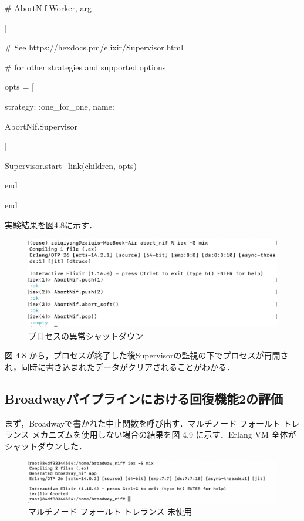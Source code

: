\documentclass[a4paper]{jreport}	%
\begin{document}
      \# {AbortNif.Worker, arg}
      
    ]

    \# See https://hexdocs.pm/elixir/Supervisor.html
    
    \# for other strategies and supported options
    
    opts = [
    
    strategy: :one\_for\_one, name: 
    
    AbortNif.Supervisor
    
    ]
    
    Supervisor.start\_link(children, opts)
    
  end
  
end

実験結果を図4.8に示す．

\begin{figure}[H]
\vspace{3cm}
\begin{center}
\hspace{-8cm}
\includegraphics[scale=0.5]{ja/f11.png}
\end{center}
\caption{プロセスの異常シャットダウン}
\end{figure}

図 4.8 から，プロセスが終了した後Supervisorの監視の下でプロセスが再開され，同時に書き込まれたデータがクリアされることがわかる．

\subsection{Broadwayパイプラインにおける回復機能2の評価}
まず，Broadwayで書かれた中止関数を呼び出す．マルチノード フォールト トレランス メカニズムを使用しない場合の結果を図 4.9 に示す．Erlang VM 全体がシャットダウンした．

\begin{figure}[H]
\vspace{1cm}
\begin{center}
\hspace{-12cm}
\includegraphics[scale=0.7]{ja/f10.png}
\end{center}
\caption{マルチノード フォールト トレランス 未使用}
\end{figure}
\end{document}
